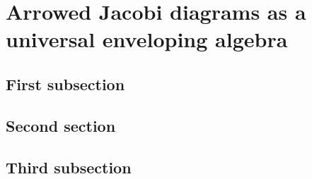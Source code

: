 \chapter{Arrowed Jacobi diagrams as a universal enveloping algebra}

\section{First subsection}

\section{Second section}

\section{Third subsection}
